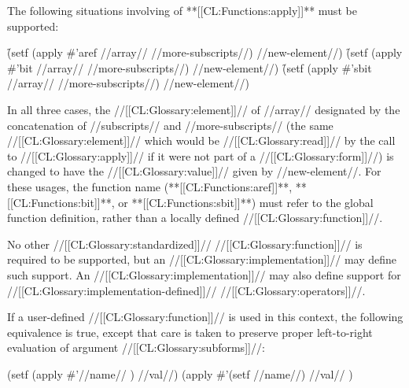 
The following situations involving  of **[[CL:Functions:apply]]** must be supported:

\beginlist
\itemitem{\bull} \f{(setf (apply \#'aref //array//
					//more-subscripts//)
			  //new-element//)}
\itemitem{\bull} \f{(setf (apply \#'bit //array// 
				       //more-subscripts//)
			  //new-element//)}
\itemitem{\bull} \f{(setf (apply \#'sbit //array// 
					//more-subscripts//) 
			  //new-element//)}
\endlist

In all three cases, the //[[CL:Glossary:element]]// of //array// designated
by the concatenation of //subscripts// and //more-subscripts//
(\ie the same //[[CL:Glossary:element]]// which would be //[[CL:Glossary:read]]// by the call to
     //[[CL:Glossary:apply]]// if it were not part of a  //[[CL:Glossary:form]]//)
is changed to have the //[[CL:Glossary:value]]// given by //new-element//.
For these usages, the function name (**[[CL:Functions:aref]]**, **[[CL:Functions:bit]]**, or **[[CL:Functions:sbit]]**)
must refer to the global function definition, rather than a locally defined
//[[CL:Glossary:function]]//.


No other //[[CL:Glossary:standardized]]// //[[CL:Glossary:function]]// is required to be supported,
but an //[[CL:Glossary:implementation]]// may define such support.
An //[[CL:Glossary:implementation]]// may also define support 
for //[[CL:Glossary:implementation-defined]]// //[[CL:Glossary:operators]]//.

If a user-defined //[[CL:Glossary:function]]// is used in this context,
the following equivalence is true, except that care is taken
to preserve proper left-to-right evaluation of argument //[[CL:Glossary:subforms]]//:

\code
 (setf (apply \#'//name// ) //val//)
 \EQ (apply \#'(setf //name//) //val// )
\endcode



\endsubsubsection%









